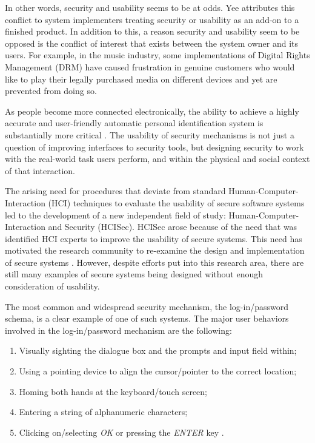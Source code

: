 \documentclass{article}
\begin{document}
In other words, security and usability seems to be at odds. Yee \cite{yee2004aligning} attributes this conflict to system implementers treating security or usability as an add-on to a finished product. In addition to this, a reason security and usability seem to be opposed is the conflict of interest that exists between the system owner and its users. For example, in the music industry, some implementations of Digital Rights Management (DRM) have caused frustration in genuine customers who would like to play their legally purchased media on different devices and yet are prevented from doing so. 

As people become more connected electronically, the ability to achieve a highly accurate and user-friendly automatic personal identification system is substantially more critical \cite{jain2000biometric}. The usability of security mechanisms is not just a question of improving interfaces to security tools, but designing security to work with the real-world task users perform, and within the physical and social context of that interaction. 

The arising need for procedures that deviate from standard Human-Computer-Interaction (HCI) techniques to evaluate the usability of secure software systems led to the development of a new independent field of study: Human-Computer-Interaction and Security (HCISec). HCISec arose because of the need that was identified HCI experts to improve the usability of secure systems. This need has motivated the research community to re-examine the design and implementation of secure systems \cite{kainda2010security}. However, despite efforts put into this research area, there are still many examples of secure systems being designed without enough consideration of usability.

The most common and widespread security mechanism, the log-in/password schema, is a clear example of one of such systems. The major user behaviors involved in the log-in/password mechanism are the following:
\begin{enumerate}
\item Visually sighting the dialogue box and the prompts and input field within;
\item Using a pointing device to align the cursor/pointer to the correct location;
\item Homing both hands at the keyboard/touch screen;
\item Entering a string of alphanumeric characters;
\item Clicking on/selecting \textit{OK} or pressing the \textit{ENTER} key \cite{schultz2001usability}.
\end{enumerate}
\end{document}
